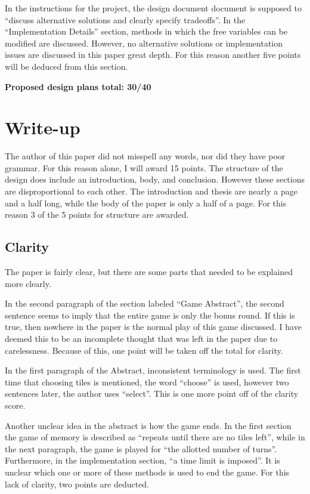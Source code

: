 In the instructions for the project, the design document document is supposed to ``discuss
alternative solutions and clearly specify tradeoffs''.  In the ``Implementation Details'' section,
methods in which the free variables can be modified are discussed.  However, no alternative solutions
or implementation issues are discussed in this paper great depth.  For this reason another five points
will be deduced from this section.

\hspace{20pt}

{\bf Proposed design plans total: 30/40}

\section{Write-up}
The author of this paper did not misspell any words, nor did they have poor grammar. For this
reason alone, I will award 15 points.  The structure of the design does include an introduction,
body, and conclusion.  However these sections are disproportional to each other.  The
introduction and thesis are nearly a page and a half long, while the body of the paper is only
a half of a page.  For this reason 3 of the 5 points for structure are awarded.

\subsection{Clarity}

The paper is fairly
clear, but there are some parts that needed to be explained more clearly.

In the second paragraph of
the section labeled ``Game Abstract'', the second sentence seems to imply that the entire game
is only the bonus round.  If this is true, then nowhere in the paper is the normal play of this
game discussed.  I have deemed this to be an incomplete thought that was left in the paper due to
carelessness. Because of this, one point will be taken off the total for clarity.

In the first paragraph of
the Abstract, inconsistent terminology is used.  The first time that choosing tiles is mentioned,
the word ``choose'' is used, however two sentences later, the author uses ``select''.  This is
one more point off of the clarity score.

Another unclear idea in the abstract is how the game
ends.  In the first section the game of memory is described as ``repeats until there are no tiles
left'', while in the next paragraph, the game is played for ``the allotted number of turns''.
Furthermore, in the implementation section, ``a time limit is imposed''.  It is unclear which one
or more of these methods is used to end the game. For this lack of clarity, two points are deducted.

